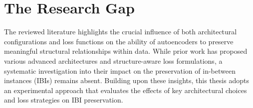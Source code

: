 \section{The Research Gap}

The reviewed literature highlights the crucial influence of both architectural configurations and loss functions on the ability of autoencoders to preserve meaningful structural relationships within data. While prior work has proposed various advanced architectures and structure-aware loss formulations, a systematic investigation into their impact on the preservation of in-between instances (IBIs) remains absent. Building upon these insights, this thesis adopts an experimental approach that evaluates the effects of key architectural choices and loss strategies on IBI preservation.
